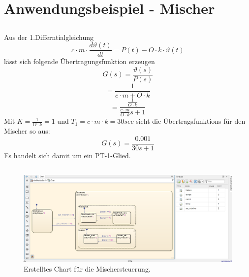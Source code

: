 \documentclass{article}
\begin{document}
	\section{Anwendungsbeispiel - Mischer}
		\subsection{}
			Aus der 1.Differntialgleichung
			$$c\cdot m \cdot \frac{d\vartheta(t)}{dt}= P(t) - O\cdot k \cdot \vartheta(t) $$
			lässt sich folgende Übertragungsfunktion erzeugen
			$$G(s) = \frac{\vartheta (s)}{P(s)}$$
			$$ = \frac{1}{c\cdot m + O\cdot k} $$
			$$ = \frac{\frac{1}{O\cdot k}}{\frac{c\cdot m}{O\cdot k}s + 1}$$
			Mit $K=\frac{1}{O\cdot k} = 1$ und $T_1 = c\cdot m \cdot k = 30 sec$ sieht die Übertragsfunktions für den Mischer so aus:
			$$G(s) = \frac{0.001}{30s + 1}$$
			Es handelt sich damit um ein PT-1-Glied.
		\subsection{}
			\begin{figure}[h]
				\centering
				\includegraphics[scale=0.5]{Aufgabe4.4Chart.png}
				\caption{Erstelltes Chart für die Mischersteuerung.}
				\label{fig_13: Aufg_4b_Mischer}
			\end{figure}
\newpage
\end{document}
